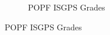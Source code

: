 \begin{figure}[t]
\begin{subfigure}{0.48\textwidth}
		\caption{POPF ISGPS Grades}
		\label{fig:crp_comp_crp_popf_isgps}
	\end{subfigure}
\end{figure}
\hfill



\clearpage
